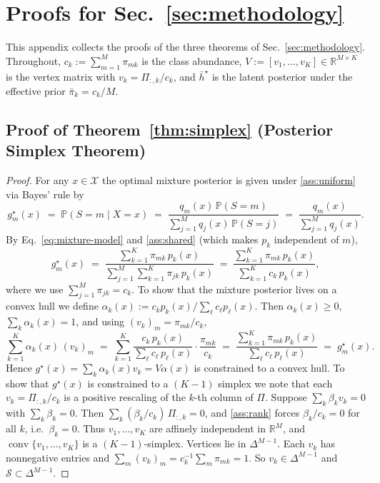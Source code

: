 \documentclass{article}
\theoremstyle{plain}
\theoremstyle{definition}
\theoremstyle{remark}
\newcommand{\Pp}{\mathbb{P}}
\newcommand{\R}{\mathbb{R}}
\newcommand{\X}{\mathcal{X}}
\DeclareMathOperator{\conv}{conv}
\newcommand{\asmp}[1]{\ref{#1}} %
\begin{document}
\section{Proofs for Sec.~\ref{sec:methodology}}
\label{app:proofs}

This appendix collects the proofs of the three theorems of Sec.~\ref{sec:methodology}. Throughout, $c_k := \sum_{m=1}^M \pi_{mk}$ is the class abundance, $V := [v_1,\dots,v_K] \in \R^{M\times K}$ is the vertex matrix with $v_k = \Pi_{:,k}/c_k$, and $\bar h^\star$ is the latent posterior under the effective prior $\bar\pi_k = c_k/M$.

\subsection{Proof of Theorem~\ref{thm:simplex} (Posterior Simplex Theorem)}
\label{app:proofs:simplex}

\begin{proof}
For any $x \in \X$ the optimal mixture posterior is given under \asmp{ass:uniform} via Bayes' rule by 
\begin{equation}
g_m^\star(x) \;=\; \Pp(S=m \mid X=x) \;=\; \frac{q_m(x)\,\Pp(S=m)}{\sum_{j=1}^M q_j(x)\,\Pp(S=j)} \;=\; \frac{q_m(x)}{\sum_{j=1}^M q_j(x)}.
\end{equation}
By Eq.~\ref{eq:mixture-model} and \asmp{ass:shared} (which makes $p_k$ independent of $m$),
\begin{equation}
g_m^\star(x) \;=\; \frac{\sum_{k=1}^K \pi_{mk}\, p_k(x)}{\sum_{j=1}^M \sum_{k=1}^K \pi_{jk}\, p_k(x)} \;=\; \frac{\sum_{k=1}^K \pi_{mk}\, p_k(x)}{\sum_{k=1}^K c_k\, p_k(x)},
\end{equation}
where we use $\sum_{j=1}^M \pi_{jk} = c_k$.
To show that the mixture posterior lives on a convex hull we define $\alpha_k(x) := c_k p_k(x) / \sum_\ell c_\ell p_\ell(x)$. Then $\alpha_k(x) \ge 0$, $\sum_k \alpha_k(x) = 1$, and using $(v_k)_m = \pi_{mk}/c_k$,
\begin{equation}
\sum_{k=1}^K \alpha_k(x)\,(v_k)_m \;=\; \sum_{k=1}^K \frac{c_k\, p_k(x)}{\sum_\ell c_\ell\, p_\ell(x)} \cdot \frac{\pi_{mk}}{c_k} \;=\; \frac{\sum_{k=1}^K \pi_{mk}\, p_k(x)}{\sum_\ell c_\ell\, p_\ell(x)} \;=\; g_m^\star(x).
\end{equation}
Hence $g^\star(x) = \sum_k \alpha_k(x) v_k = V\alpha(x)$ is constrained to a convex hull.\newline
To show that $g^\star(x)$ is constrained to a $(K-1)$ simplex we note that each $v_k = \Pi_{:,k}/c_k$ is a positive rescaling of the $k$-th column of $\Pi$. Suppose $\sum_k \beta_k v_k = 0$ with $\sum_k \beta_k = 0$. Then $\sum_k (\beta_k/c_k)\,\Pi_{:,k} = 0$, and \asmp{ass:rank} forces $\beta_k/c_k = 0$ for all $k$, i.e.\ $\beta_k = 0$. Thus $v_1,\dots,v_K$ are affinely independent in $\R^M$, and $\conv\{v_1,\dots,v_K\}$ is a $(K-1)$-simplex.
Vertices lie in $\Delta^{M-1}$. Each $v_k$ has nonnegative entries and $\sum_m (v_k)_m = c_k^{-1} \sum_m \pi_{mk} = 1$. So $v_k \in \Delta^{M-1}$ and $\mathcal{S} \subset \Delta^{M-1}$.
\end{proof}
\end{document}
